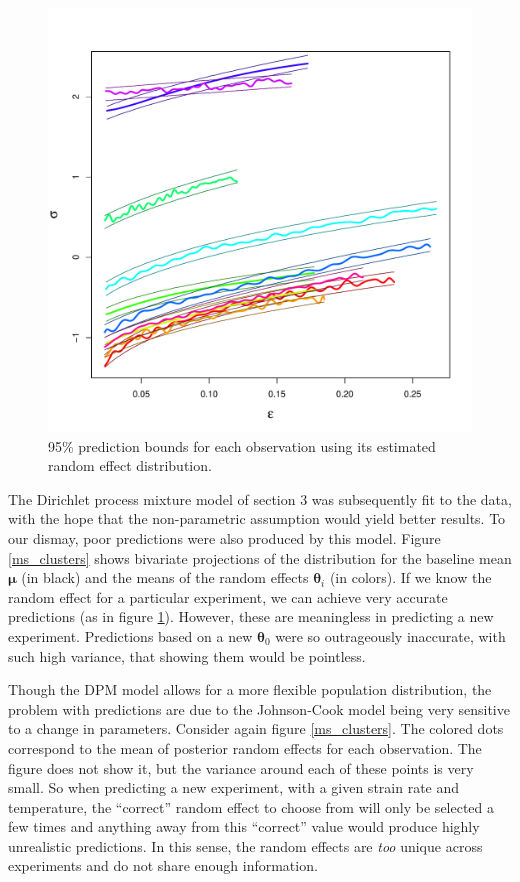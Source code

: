 \documentclass[12pt]{article}
\newcommand{\m}[1]{\mathbf{\bm{#1}}}
\begin{document}
\begin{figure}
\begin{center}
\includegraphics[scale=0.39]{../figs/ms_predsA.pdf}
\caption{95\% prediction bounds for each observation using its estimated random effect distribution.}
\label{ms_y}
\end{center}
\end{figure}

The Dirichlet process mixture model of section 3 was subsequently fit to the data, with the hope that the non-parametric assumption would yield better results. To our dismay, poor predictions were also produced by this model. Figure \ref{ms_clusters} shows bivariate projections of the distribution for the baseline mean $\m{\mu}$ (in black) and the means of the random effects $\m{\theta}_i$ (in colors). If we know the random effect for a particular experiment, we can achieve very accurate predictions (as in figure \ref{ms_y}). However, these are meaningless in predicting a new experiment. Predictions based on a new $\m{\theta}_0$ were so outrageously inaccurate, with such high variance, that showing them would be pointless.

Though the DPM model allows for a more flexible population distribution, the problem with predictions are due to the Johnson-Cook model being very sensitive to a change in parameters. Consider again figure \ref{ms_clusters}. The colored dots correspond to the mean of posterior random effects for each observation. The figure does not show it, but the variance around each of these points is very small. So when predicting a new experiment, with a given strain rate and temperature, the ``correct'' random effect to choose from will only be selected a few times and anything away from this ``correct'' value would produce highly unrealistic predictions. In this sense, the random effects are \emph{too} unique across experiments and do not share enough information.
\end{document}
